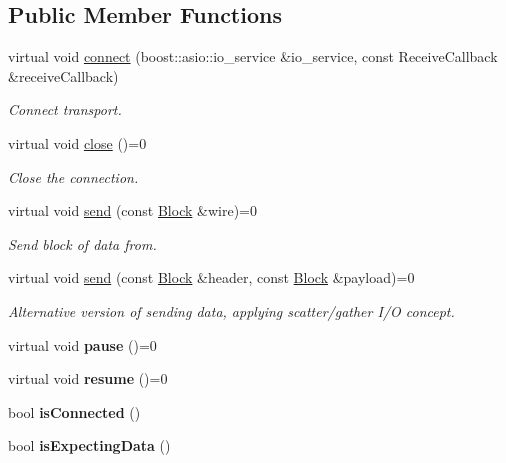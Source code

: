 \subsection*{Public Member Functions}
\begin{DoxyCompactItemize}
\item 
virtual void \hyperlink{classndn_1_1Transport_ad0b3158586d56cea4d434f099736a949}{connect} (boost\+::asio\+::io\+\_\+service \&io\+\_\+service, const Receive\+Callback \&receive\+Callback)
\begin{DoxyCompactList}\small\item\em Connect transport. \end{DoxyCompactList}\item 
virtual void \hyperlink{classndn_1_1Transport_abc3f2284b41a11fb808c70edbdc0a9c6}{close} ()=0\hypertarget{classndn_1_1Transport_abc3f2284b41a11fb808c70edbdc0a9c6}{}\label{classndn_1_1Transport_abc3f2284b41a11fb808c70edbdc0a9c6}

\begin{DoxyCompactList}\small\item\em Close the connection. \end{DoxyCompactList}\item 
virtual void \hyperlink{classndn_1_1Transport_ac24f9ec11dc2ac4569e5504eebd5cfa7}{send} (const \hyperlink{classndn_1_1Block}{Block} \&wire)=0
\begin{DoxyCompactList}\small\item\em Send block of data from. \end{DoxyCompactList}\item 
virtual void \hyperlink{classndn_1_1Transport_aa27593978570e95a5793b2af0dac3568}{send} (const \hyperlink{classndn_1_1Block}{Block} \&header, const \hyperlink{classndn_1_1Block}{Block} \&payload)=0
\begin{DoxyCompactList}\small\item\em Alternative version of sending data, applying scatter/gather I/O concept. \end{DoxyCompactList}\item 
virtual void {\bfseries pause} ()=0\hypertarget{classndn_1_1Transport_aeabd403322f1ac1c4e4295c0e24ede6e}{}\label{classndn_1_1Transport_aeabd403322f1ac1c4e4295c0e24ede6e}

\item 
virtual void {\bfseries resume} ()=0\hypertarget{classndn_1_1Transport_a2bcf1317565c1241c731416a131b642c}{}\label{classndn_1_1Transport_a2bcf1317565c1241c731416a131b642c}

\item 
bool {\bfseries is\+Connected} ()\hypertarget{classndn_1_1Transport_ab0ae19c4d7aa852b72049a6fc5bfe236}{}\label{classndn_1_1Transport_ab0ae19c4d7aa852b72049a6fc5bfe236}

\item 
bool {\bfseries is\+Expecting\+Data} ()\hypertarget{classndn_1_1Transport_a4f69b6bd3088760cb38b6a7c2e5452c8}{}\label{classndn_1_1Transport_a4f69b6bd3088760cb38b6a7c2e5452c8}

\end{DoxyCompactItemize}
